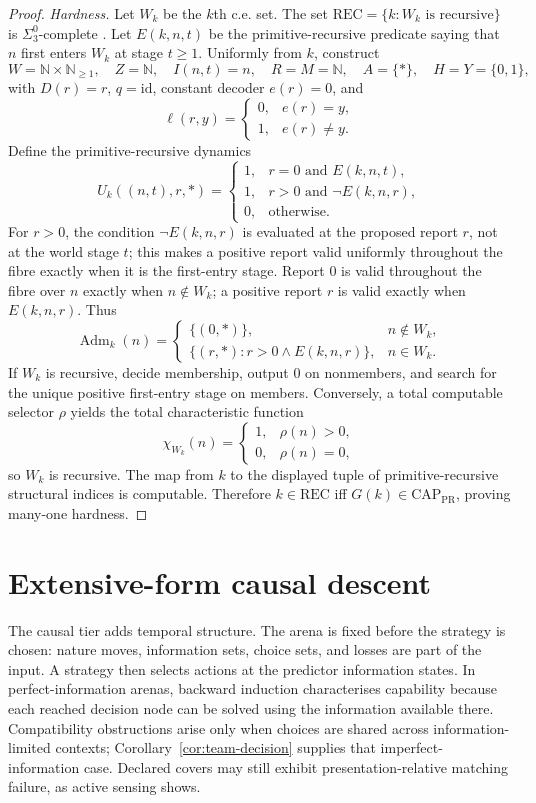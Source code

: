 \documentclass[11pt]{article}
\theoremstyle{plain}
\theoremstyle{definition}
\theoremstyle{remark}
\newcommand{\N}{\mathbb{N}}
\newcommand{\Adm}{\operatorname{Adm}}
\begin{document}
\begin{proof}
\emph{Hardness.} Let $W_k$ be the $k$th c.e. set. The set
$\mathrm{REC}=\{k:W_k\text{ is recursive}\}$ is $\Sigma^0_3$-complete
\cite{soare}. Let $E(k,n,t)$ be the primitive-recursive predicate saying that
$n$ first enters $W_k$ at stage $t\ge1$. Uniformly from $k$, construct
\[
W=\N\times\N_{\ge1},\quad Z=\N,\quad I(n,t)=n,
\quad R=M=\N,\quad A=\{\ast\},\quad H=Y=\{0,1\},
\]
with $D(r)=r$, $q=\mathrm{id}$, constant decoder $e(r)=0$, and
\[
\ell(r,y)=
\begin{cases}0,&e(r)=y,\\1,&e(r)\ne y.\end{cases}
\]
Define the primitive-recursive dynamics
\[
U_k((n,t),r,\ast)=
\begin{cases}
1,&r=0\text{ and }E(k,n,t),\\
1,&r>0\text{ and }\neg E(k,n,r),\\
0,&\text{otherwise}.
\end{cases}
\]
For $r>0$, the condition $\neg E(k,n,r)$ is evaluated at the proposed report
$r$, not at the world stage $t$; this makes a positive report valid uniformly
throughout the fibre exactly when it is the first-entry stage. Report $0$ is
valid throughout the fibre over $n$ exactly when
$n\notin W_k$; a positive report $r$ is valid exactly when $E(k,n,r)$. Thus
\[
\Adm_k(n)=
\begin{cases}
\{(0,\ast)\},&n\notin W_k,\\
\{(r,\ast):r>0\land E(k,n,r)\},&n\in W_k.
\end{cases}
\]
If $W_k$ is recursive, decide membership, output $0$ on nonmembers, and search
for the unique positive first-entry stage on members. Conversely, a total
computable selector $\rho$ yields the total characteristic function
\[
\chi_{W_k}(n)=
\begin{cases}1,&\rho(n)>0,\\0,&\rho(n)=0,\end{cases}
\]
so $W_k$ is recursive. The map from $k$ to the displayed tuple of
primitive-recursive structural indices is computable. Therefore
$k\in\mathrm{REC}$ iff $G(k)\in\mathrm{CAP}_{\mathrm{PR}}$, proving many-one
hardness.
\end{proof}

\section{Extensive-form causal descent}\label{sec:feedback}

The causal tier adds temporal structure. The arena is fixed before the strategy
is chosen: nature moves, information sets, choice sets, and losses are part of
the input. A strategy then selects actions at the predictor information states.
In perfect-information arenas, backward induction characterises capability
because each reached decision node can be solved using the information available
there. Compatibility obstructions arise only when choices are shared across
information-limited contexts; Corollary~\ref{cor:team-decision} supplies that
imperfect-information case. Declared covers may still exhibit
presentation-relative matching failure, as active sensing shows.
\end{document}
